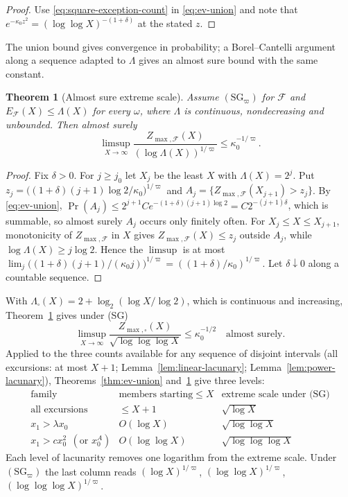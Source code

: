 \documentclass[11pt]{amsart}
\numberwithin{equation}{section}
\theoremstyle{plain}
\newtheorem{theorem}{Theorem}[section]
\theoremstyle{definition}
\theoremstyle{remark}
\newcommand{\F}{\mathcal{F}}
\begin{document}
\begin{proof}
Use \eqref{eq:square-exception-count} in \eqref{eq:ev-union} and note that
$e^{-\kappa_0z^2}=(\log\log X)^{-(1+\delta)}$ at the stated $z$.
\end{proof}

The union bound gives convergence in probability; a Borel--Cantelli argument
along a sequence adapted to $\Lambda$ gives an almost sure bound with the same
constant.

\begin{theorem}[Almost sure extreme scale]
\label{thm:ev-as}
Assume $(\mathrm{SG}_\varpi)$ for $\F$ and $E_\F(X)\le \Lambda(X)$ for every $\omega$,
where $\Lambda$ is continuous, nondecreasing and unbounded. Then almost surely
\[
\limsup_{X\to\infty}\frac{Z_{\max,\F}(X)}{(\log \Lambda(X))^{1/\varpi}}\le \kappa_0^{-1/\varpi}.
\]
\end{theorem}

\begin{proof}
Fix $\delta>0$. For $j\ge j_0$ let $X_j$ be the least $X$ with $\Lambda(X)=2^j$.
Put $z_j=\bigl((1+\delta)(j+1)\log2/\kappa_0\bigr)^{1/\varpi}$ and
$A_j=\{Z_{\max,\F}(X_{j+1})>z_j\}$. By \eqref{eq:ev-union},
$\Pr(A_j)\le2^{j+1}Ce^{-(1+\delta)(j+1)\log2}=C2^{-(j+1)\delta}$, which is
summable, so almost surely $A_j$ occurs only finitely often. For
$X_j\le X\le X_{j+1}$, monotonicity of $Z_{\max,\F}$ in $X$ gives
$Z_{\max,\F}(X)\le z_j$ outside $A_j$, while $\log \Lambda(X)\ge j\log2$. Hence
the $\limsup$ is at most
$\lim_j\bigl((1+\delta)(j+1)/(\kappa_0j)\bigr)^{1/\varpi}=((1+\delta)/\kappa_0)^{1/\varpi}$. Let
$\delta\downarrow0$ along a countable sequence.
\end{proof}

With $\Lambda_\square(X)=2+\log_2(\log X/\log2)$, which is continuous and
increasing, Theorem~\ref{thm:ev-as} gives under (SG)
\[
\limsup_{X\to\infty}\frac{Z_{\max,\square}(X)}{\sqrt{\log\log\log X}}\le \kappa_0^{-1/2}
\quad\text{almost surely.}
\]
Applied to the three counts available for any sequence of disjoint
intervals (all excursions: at most $X+1$; Lemma~\ref{lem:linear-lacunary};
Lemma~\ref{lem:power-lacunary}), Theorems~\ref{thm:ev-union}
and~\ref{thm:ev-as} give three levels:
\[
\begin{array}{c|c|c}
\text{family} & \text{members starting}\le X & \text{extreme scale under (SG)}\\
\hline
\text{all excursions} & \le X+1 & \sqrt{\log X}\\
x_1>\lambda x_0 & O(\log X) & \sqrt{\log\log X}\\
x_1>cx_0^2\ \ (\text{or }x_0^A) & O(\log\log X) & \sqrt{\log\log\log X}
\end{array}
\]
Each level of lacunarity removes one logarithm from the extreme scale.
Under $(\mathrm{SG}_\varpi)$ the last column reads $(\log X)^{1/\varpi}$,
$(\log\log X)^{1/\varpi}$, $(\log\log\log X)^{1/\varpi}$.
\end{document}
